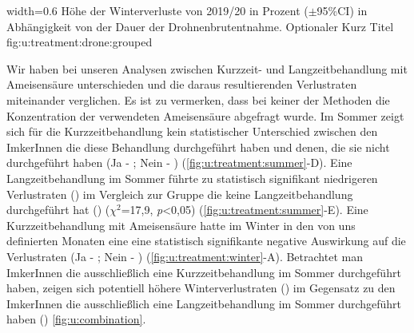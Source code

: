 {width=0.6\textwidth} %
{Höhe der Winterverluste von 2019/20 in Prozent ($\pm$95\%CI) in Abhängigkeit von der Dauer der Drohnenbrutentnahme.} %
{Optionaler Kurz Titel} %
{fig:u:treatment:drone:grouped} %



Wir haben bei unseren Analysen zwischen Kurzzeit- und Langzeitbehandlung mit Ameisensäure unterschieden und die daraus resultierenden Verlustraten miteinander verglichen. Es ist zu vermerken, dass bei keiner der Methoden die Konzentration der verwendeten Ameisensäure abgefragt wurde.
\newline
Im Sommer zeigt sich für die Kurzzeitbehandlung kein statistischer Unterschied zwischen den ImkerInnen die diese Behandlung durchgeführt haben und denen, die sie nicht durchgeführt haben (Ja - ; Nein - ) (\cref{fig:u:treatment:summer}-D). Eine Langzeitbehandlung im Sommer führte zu statistisch signifikant niedrigeren Verlustraten () im Vergleich zur Gruppe die keine Langzeitbehandlung durchgeführt hat () ($\chi^{2}$=17,9, \textit{p}<0,05) (\cref{fig:u:treatment:summer}-E). Eine Kurzzeitbehandlung mit Ameisensäure hatte im Winter in den von uns definierten Monaten eine eine statistisch signifikante negative Auswirkung auf die Verlustraten (Ja - ; Nein - ) (\cref{fig:u:treatment:winter}-A).
\newline
Betrachtet man ImkerInnen die ausschließlich eine Kurzzeitbehandlung im Sommer durchgeführt haben, zeigen sich potentiell höhere Winterverlustraten () im Gegensatz zu den ImkerInnen die ausschließlich eine Langzeitbehandlung im Sommer durchgeführt haben () \cref{fig:u:combination}.


